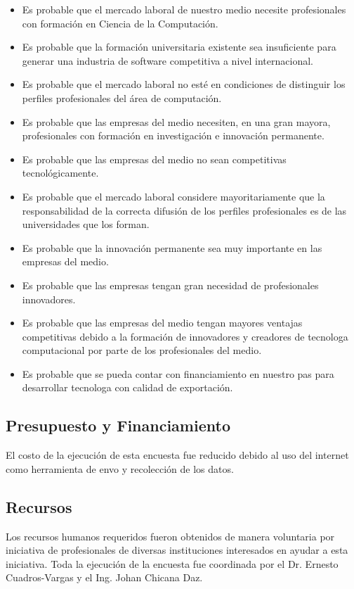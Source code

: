\begin{itemize}
 \item Es probable que el mercado laboral de nuestro medio necesite profesionales con formación en Ciencia de la Computación.
\item Es probable que la formación universitaria existente sea insuficiente para generar una industria de software competitiva a nivel internacional.
\item Es probable que el mercado laboral no esté en condiciones de distinguir los perfiles profesionales del área de computación.
\item Es probable que las empresas del medio necesiten, en una gran mayor­a, profesionales con formación en investigación e innovación permanente.
\item Es probable que las empresas del medio no sean competitivas tecnológicamente.
\item Es probable que el mercado laboral considere mayoritariamente que la responsabilidad de la correcta difusión de los perfiles profesionales es de las universidades que los forman.
\item Es probable que la innovación permanente sea muy importante en las empresas del medio.
\item Es probable que las empresas tengan gran necesidad de profesionales innovadores.
\item Es probable que las empresas del medio tengan mayores ventajas competitivas debido a la formación de innovadores y creadores de tecnolog­a computacional por parte de los profesionales del medio.
\item Es probable que se pueda contar con financiamiento en nuestro pa­s para desarrollar tecnolog­a con calidad de exportación.
\end{itemize}


\subsection{Presupuesto y Financiamiento}
El costo de la ejecución de esta encuesta fue reducido debido al uso del internet como herramienta de env­o y recolección de los datos. 

\subsection{Recursos}
Los recursos humanos requeridos fueron obtenidos de manera voluntaria por iniciativa de profesionales de diversas instituciones interesados en ayudar a esta iniciativa. Toda la ejecución de la encuesta fue coordinada por el Dr. Ernesto Cuadros-Vargas y el Ing. Johan Chicana D­az.

